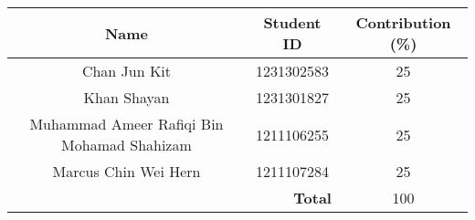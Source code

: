 \documentclass[12pt,a4paper]{article}
\begin{document}
\vspace{-10pt}

\begin{table}[h]
    \centering
    \begin{tabular}{|c|c|c|}
        \hline
        \textbf{Name} & \textbf{Student ID} & \textbf{Contribution (\%)} \\ \hline
        Chan Jun Kit  & 1231302583 & 25   \\ \hline
        Khan Shayan   & 1231301827 & 25   \\ \hline
        Muhammad Ameer Rafiqi Bin Mohamad Shahizam & 1211106255 & 25  \\ \hline
        Marcus Chin Wei Hern & 1211107284 & 25   \\ \hline
        \multicolumn{2}{|r|}{\textbf{Total}} & 100 \\ \hline
    \end{tabular}
\end{table}
\end{document}
